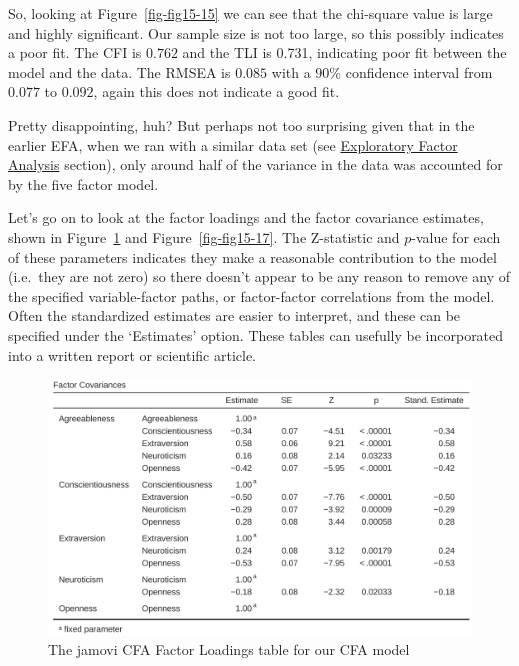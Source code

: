 \documentclass[
  a4paper,
]{book}
\begin{document}
So, looking at Figure~\ref{fig-fig15-15} we can see that the chi-square
value is large and highly significant. Our sample size is not too large,
so this possibly indicates a poor fit. The CFI is \(0.762\) and the TLI
is 0.731, indicating poor fit between the model and the data. The RMSEA
is \(0.085\) with a \(90\%\) confidence interval from \(0.077\) to
\(0.092\), again this does not indicate a good fit.

Pretty disappointing, huh? But perhaps not too surprising given that in
the earlier EFA, when we ran with a similar data set (see
\protect\hyperlink{exploratory-factor-analysis}{Exploratory Factor
Analysis} section), only around half of the variance in the data was
accounted for by the five factor model.

Let's go on to look at the factor loadings and the factor covariance
estimates, shown in Figure~\ref{fig-fig15-16} and
Figure~\ref{fig-fig15-17}. The Z-statistic and \(p\)-value for each of
these parameters indicates they make a reasonable contribution to the
model (i.e.~they are not zero) so there doesn't appear to be any reason
to remove any of the specified variable-factor paths, or factor-factor
correlations from the model. Often the standardized estimates are easier
to interpret, and these can be specified under the `Estimates' option.
These tables can usefully be incorporated into a written report or
scientific article.

\begin{figure}

\includegraphics[width=1\textwidth,height=\textheight]{images/fig15-16.png} \hfill{}

\caption{\label{fig-fig15-16}The jamovi CFA Factor Loadings table for
our CFA model}

\end{figure}
\end{document}
